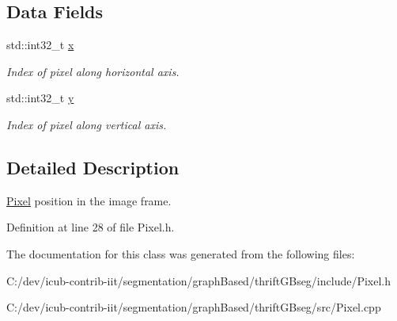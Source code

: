 \subsection*{Data Fields}
\begin{DoxyCompactItemize}
\item 
\mbox{\label{classyarp_1_1sig_1_1Pixel_ad3071410597bc7271a53b7df7bc796fc}} 
std\+::int32\+\_\+t \mbox{\hyperlink{classyarp_1_1sig_1_1Pixel_ad3071410597bc7271a53b7df7bc796fc}{x}}
\begin{DoxyCompactList}\small\item\em Index of pixel along horizontal axis. \end{DoxyCompactList}\item 
\mbox{\label{classyarp_1_1sig_1_1Pixel_a603768ad1ecf291c12d2f56e0828625c}} 
std\+::int32\+\_\+t \mbox{\hyperlink{classyarp_1_1sig_1_1Pixel_a603768ad1ecf291c12d2f56e0828625c}{y}}
\begin{DoxyCompactList}\small\item\em Index of pixel along vertical axis. \end{DoxyCompactList}\end{DoxyCompactItemize}


\subsection{Detailed Description}
\mbox{\hyperlink{classyarp_1_1sig_1_1Pixel}{Pixel}} position in the image frame. 

Definition at line 28 of file Pixel.\+h.



The documentation for this class was generated from the following files\+:\begin{DoxyCompactItemize}
\item 
C\+:/dev/icub-\/contrib-\/iit/segmentation/graph\+Based/thrift\+G\+Bseg/include/Pixel.\+h\item 
C\+:/dev/icub-\/contrib-\/iit/segmentation/graph\+Based/thrift\+G\+Bseg/src/Pixel.\+cpp\end{DoxyCompactItemize}
